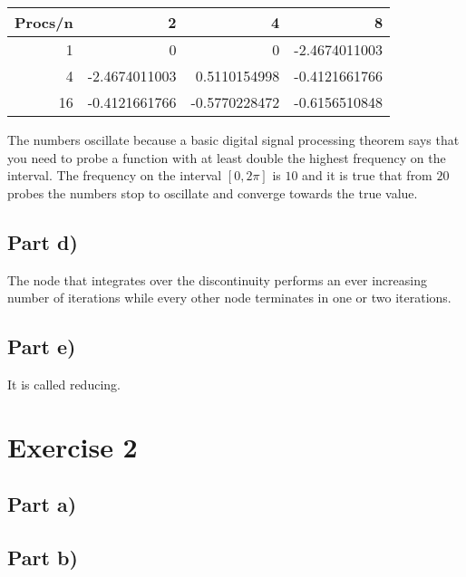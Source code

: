 \documentclass[10pt,a4paper]{article}
\begin{document}
\begin{tabular}{rrrr}
Procs/n & 2 & 4 & 8\\
\hline
1 & 0 & 0 & -2.4674011003\\
4 & -2.4674011003 & 0.5110154998 & -0.4121661766\\
16 & -0.4121661766 & -0.5770228472 & -0.6156510848\\
\end{tabular}
\begin{comment}
#+ORGTBL: SEND exercise-1-c orgtbl-to-latex :splice nil :skip 0
| Procs/n | 2               | 4               | 8               |
|---------+-----------------+-----------------+-----------------|
|       1 | $0$             | $0$             | $-2.4674011003$ |
|       4 | $-2.4674011003$ | $0.5110154998$  | $-0.4121661766$ |
|      16 | $-0.4121661766$ | $-0.5770228472$ | $-0.6156510848$ |
\end{comment}
The numbers oscillate because a basic digital signal processing theorem says that you need to probe a function with at least double the highest frequency on the interval.
The frequency on the interval $[0, 2\pi]$ is $10$ and it is true that from $20$ probes the numbers stop to oscillate and converge towards the true value.

\subsection*{Part d)}

The node that integrates over the discontinuity performs an ever increasing number of iterations while every other node terminates in one or two iterations.

\subsection*{Part e)}

It is called reducing.

\section*{Exercise 2}

\subsection*{Part a)}

\subsection*{Part b)}
\end{document}
